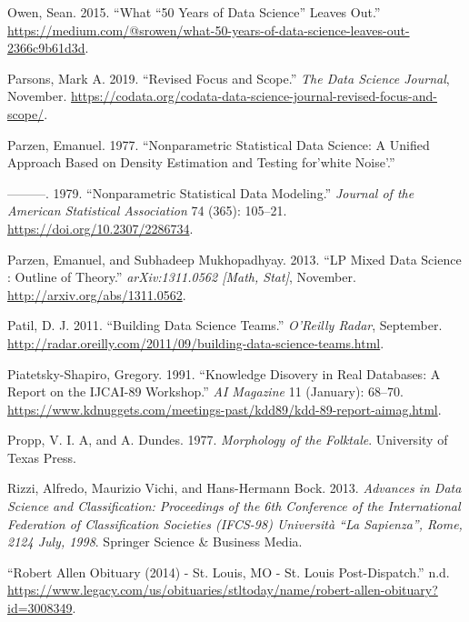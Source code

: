 \documentclass[
  letterpaper,
]{report}
\newlength{\cslhangindent}
\newlength{\cslentryspacingunit} %
\newenvironment{CSLReferences}[2] %
 {%
  \setlength{\parindent}{0pt}
  \ifodd #1
  \let\oldpar\par
  \def\par{\hangindent=\cslhangindent\oldpar}
  \fi
  \setlength{\parskip}{#2\cslentryspacingunit}
 }%
 {}
\begin{document}
\begin{CSLReferences}{1}{0}
\leavevmode{}%
Owen, Sean. 2015. {``What {``}50 Years of Data Science{''} Leaves
Out.''}
\url{https://medium.com/@srowen/what-50-years-of-data-science-leaves-out-2366c9b61d3d}.

\leavevmode{}%
Parsons, Mark A. 2019. {``Revised Focus and Scope.''} \emph{The Data
Science Journal}, November.
\url{https://codata.org/codata-data-science-journal-revised-focus-and-scope/}.

\leavevmode{}%
Parzen, Emanuel. 1977. {``Nonparametric Statistical Data Science: A
Unified Approach Based on Density Estimation and Testing for'white
Noise'.''}

\leavevmode{}%
---------. 1979. {``Nonparametric Statistical Data Modeling.''}
\emph{Journal of the American Statistical Association} 74 (365):
105--21. \url{https://doi.org/10.2307/2286734}.

\leavevmode{}%
Parzen, Emanuel, and Subhadeep Mukhopadhyay. 2013. {``LP Mixed Data
Science : Outline of Theory.''} \emph{arXiv:1311.0562 {[}Math, Stat{]}},
November. \url{http://arxiv.org/abs/1311.0562}.

\leavevmode{}%
Patil, D. J. 2011. {``Building Data Science Teams.''} \emph{O'Reilly
Radar}, September.
\url{http://radar.oreilly.com/2011/09/building-data-science-teams.html}.

\leavevmode{}%
Piatetsky-Shapiro, Gregory. 1991. {``Knowledge Disovery in Real
Databases: A Report on the IJCAI-89 Workshop.''} \emph{AI Magazine} 11
(January): 68--70.
\url{https://www.kdnuggets.com/meetings-past/kdd89/kdd-89-report-aimag.html}.

\leavevmode{}%
Propp, V. I. A, and A. Dundes. 1977. \emph{Morphology of the Folktale}.
University of Texas Press.

\leavevmode{}%
Rizzi, Alfredo, Maurizio Vichi, and Hans-Hermann Bock. 2013.
\emph{Advances in Data Science and Classification: Proceedings of the
6th Conference of the International Federation of Classification
Societies (IFCS-98) Università {``}La Sapienza{''}, Rome,
21{\textendash}24 July, 1998}. Springer Science \& Business Media.

\leavevmode{}%
{``Robert Allen Obituary (2014) - St. Louis, MO - St. Louis
Post-Dispatch.''} n.d.
\url{https://www.legacy.com/us/obituaries/stltoday/name/robert-allen-obituary?id=3008349}.


\end{CSLReferences}
\end{document}
